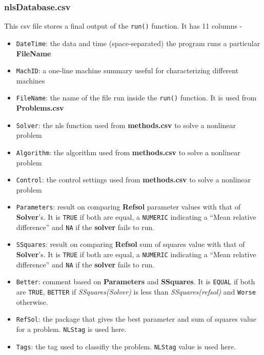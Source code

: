 \hypertarget{nlsdatabase.csv}{%
\subsubsection{nlsDatabase.csv}\label{nlsdatabase.csv}}

This csv file stores a final output of the \texttt{run()} function. It
has 11 columns -

\begin{itemize}
\tightlist
\item
  \texttt{DateTime}: the data and time (space-separated) the program
  runs a particular \textbf{FileName}
\item
  \texttt{MachID}: a one-line machine summary useful for characterizing
  different machines
\item
  \texttt{FileName}: the name of the file run inside the \texttt{run()}
  function. It is used from \textbf{Problems.csv}
\item
  \texttt{Solver}: the nls function used from \textbf{methods.csv} to
  solve a nonlinear problem
\item
  \texttt{Algorithm}: the algorithm used from \textbf{methods.csv} to
  solve a nonlinear problem
\item
  \texttt{Control}: the control settings used from \textbf{methods.csv}
  to solve a nonlinear problem
\item
  \texttt{Parameters}: result on comparing \textbf{Refsol} parameter
  values with that of \textbf{Solver}'s. It is \texttt{TRUE} if both are
  equal, a \texttt{NUMERIC} indicating a ``Mean relative difference''
  and \texttt{NA} if the \textbf{solver} fails to run.
\item
  \texttt{SSquares}: result on comparing \textbf{Refsol} sum of squares
  value with that of \textbf{Solver}'s. It is \texttt{TRUE} if both are
  equal, a \texttt{NUMERIC} indicating a ``Mean relative difference''
  and \texttt{NA} if the \textbf{solver} fails to run.
\item
  \texttt{Better}: comment based on \textbf{Parameters} and
  \textbf{SSquares}. It is \texttt{EQUAL} if both are \texttt{TRUE},
  \texttt{BETTER} if \emph{SSquares(Solver)} is less than
  \emph{SSquares(refsol)} and \texttt{Worse} otherwise.
\item
  \texttt{RefSol}: the package that gives the best parameter and sum of
  squares value for a problem. \texttt{NLStag} is used here.
\item
  \texttt{Tags}: the tag used to classifiy the problem. \texttt{NLStag}
  value is used here.
\end{itemize}

